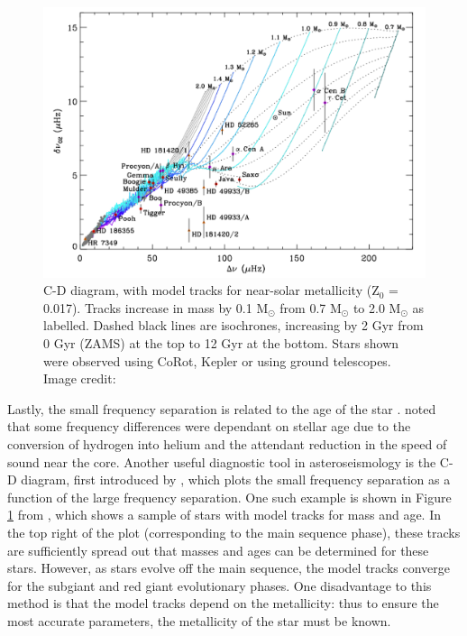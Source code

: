 \begin{figure}[t]
    \centering
    \includegraphics[scale=0.4]{Figures/1-Introduction/C-D_diagram.pdf}
    \caption[C-D diagram that can be used to age stars from asteroseismic parameters]{C-D diagram, with model tracks for near-solar metallicity (Z$_{0}$ = 0.017). Tracks increase in mass by 0.1 M$_{\odot}$ from 0.7 M$_{\odot}$ to 2.0 M$_{\odot}$ as labelled. Dashed black lines are isochrones, increasing by 2 Gyr from 0 Gyr (ZAMS) at the top to 12 Gyr at the bottom. Stars shown were observed using CoRot, Kepler or using ground telescopes. Image credit: \citet{White_etal_2011}}
    \label{fig:CD_diagram_example}
\end{figure}

Lastly, the small frequency separation is related to the age of the star \citep{Ulrich_1986}. \citet{Christensen_Dalsgaard_1984} noted that some frequency differences were dependant on stellar age due to the conversion of hydrogen into helium and the attendant reduction in the speed of sound near the core. Another useful diagnostic tool in asteroseismology is the C-D diagram, first introduced by \citet{Christensen_Dalsgaard_1984}, which plots the small frequency separation as a function of the large frequency separation. One such example is shown in Figure \ref{fig:CD_diagram_example} from \citet{White_etal_2011}, which shows a sample of stars with model tracks for mass and age. In the top right of the plot (corresponding to the main sequence phase), these tracks are sufficiently spread out that masses and ages can be determined for these stars. However, as stars evolve off the main sequence, the model tracks converge for the subgiant and red giant evolutionary phases. One disadvantage to this method is that the model tracks depend on the metallicity: thus to ensure the most accurate parameters, the metallicity of the star must be known.

